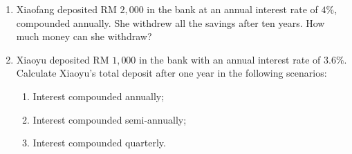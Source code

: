 \documentclass{report}
\begin{document}
        \begin{enumerate}
            \item Xiaofang deposited RM $2,000$ in the bank at an annual interest rate of $4\%$, compounded annually. She withdrew all the savings after ten years. How much money can she withdraw?
            
            \item Xiaoyu deposited RM $1,000$ in the bank with an annual interest rate of $3.6\%$. Calculate Xiaoyu's total deposit after one year in the following scenarios:
            \begin{enumerate}
                \item Interest compounded annually;
                \item Interest compounded semi-annually;
                \item Interest compounded quarterly.
            \end{enumerate}
        \end{enumerate}
\end{document}
